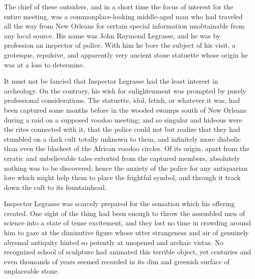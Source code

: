 The chief of these outsiders, and in a short time the focus of interest for the entire meeting, was a commonplace-looking middle-aged man who had traveled all the way from New Orleans for certain special information unobtainable from any local source. His name was John Raymond Legrasse, and he was by profession an inspector of police. With him he bore the subject of his visit, a grotesque, repulsive, and apparently very ancient stone statuette whose origin he was at a loss to determine.

It must not be fancied that Inspector Legrasse had the least interest in archeology. On the contrary, his wish for enlightenment was prompted by purely professional considerations. The statuette, idol, fetish, or whatever it was, had been captured some months before in the wooded swamps south of New Orleans during a raid on a supposed voodoo meeting; and so singular and hideous were the rites connected with it, that the police could not but realize that they had stumbled on a dark cult totally unknown to them, and infinitely more diabolic than even the blackest of the African voodoo circles. Of its origin, apart from the erratic and unbelievable tales extorted from the captured members, absolutely nothing was to be discovered; hence the anxiety of the police for any antiquarian lore which might help them to place the frightful symbol, and through it track down the cult to its fountainhead.

Inspector Legrasse was scarcely prepared for the sensation which his offering created. One sight of the thing had been enough to throw the assembled men of science into a state of tense excitement, and they lost no time in crowding around him to gaze at the diminutive figure whose utter strangeness and air of genuinely abysmal antiquity hinted so potently at unopened and archaic vistas. No recognized school of sculpture had animated this terrible object, yet centuries and even thousands of years seemed recorded in its dim and greenish surface of unplaceable stone.

